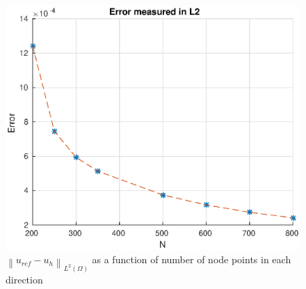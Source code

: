 \documentclass[10pt,a4paper]{article}
\newcommand{\vectornorm}[1]{\left\|#1\right\|}
\begin{document}
\begin{figure}
    \centering
    \includegraphics[scale=0.8]{figures/L2_error}
    \caption{$\vectornorm{u_{ref} - u_h}_{L^2(\Omega)}$ as a function of number of node points in each direction}
    \label{L2error}
\end{figure}
\end{document}
